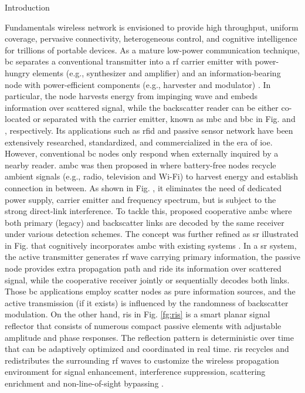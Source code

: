 \documentclass[journal]{IEEEtran}
\begin{document}
\begin{section}{Introduction}
	\begin{subsection}{Fundamentals}
		 wireless network is envisioned to provide high throughput, uniform coverage, pervasive connectivity, heterogeneous control, and cognitive intelligence for trillions of portable devices.
		As a mature low-power communication technique, \gls{bc} separates a conventional transmitter into a \gls{rf} carrier emitter with power-hungry elements (e.g., synthesizer and amplifier) and an information-bearing node with power-efficient components (e.g., harvester and modulator) \cite{Boyer2014}.
		In particular, the node harvests energy from impinging wave and embeds information over scattered signal, while the backscatter reader can be either co-located or separated with the carrier emitter, known as \gls{mbc} and \gls{bbc} in Fig.  and , respectively.
		Its applications such as \gls{rfid} \cite{Dobkin2012,Landt2005} and passive sensor network \cite{Vannucci2008,Assimonis2016} have been extensively researched, standardized, and commercialized in the era of \gls{ioe}.
		However, conventional \gls{bc} nodes only respond when externally inquired by a nearby reader.
		\gls{ambc} was then proposed in \cite{Liu2013b} where battery-free nodes recycle ambient signals (e.g., radio, television and Wi-Fi) to harvest energy and establish connection in between.
		As shown in Fig. , it eliminates the need of dedicated power supply, carrier emitter and frequency spectrum, but is subject to the strong direct-link interference.
		To tackle this, \cite{Yang2018} proposed cooperative \gls{ambc} where both primary (legacy) and backscatter links are decoded by the same receiver under various detection schemes.
		The concept was further refined as \gls{sr} illustrated in Fig.  that cognitively incorporates \gls{ambc} with existing systems \cite{Liang2020}.
		In a \gls{sr} system, the active transmitter generates \gls{rf} wave carrying primary information, the passive node provides extra propagation path and ride its information over scattered signal, while the cooperative receiver jointly or sequentially decodes both links.
		Those \gls{bc} applications employ scatter nodes as pure information sources, and the active transmission (if it exists) is influenced by the randomness of backscatter modulation.
		On the other hand, \gls{ris} in Fig. \ref{fg:ris} is a smart planar signal reflector that consists of numerous compact passive elements with adjustable amplitude and phase responses.
		The reflection pattern is deterministic over time that can be adaptively optimized and coordinated in real time.
		\gls{ris} recycles and redistributes the surrounding \gls{rf} waves to customize the wireless propagation environment for signal enhancement, interference suppression, scattering enrichment and non-line-of-sight bypassing \cite{Wu2021b}.


\end{subsection}
\end{section}
\end{document}
